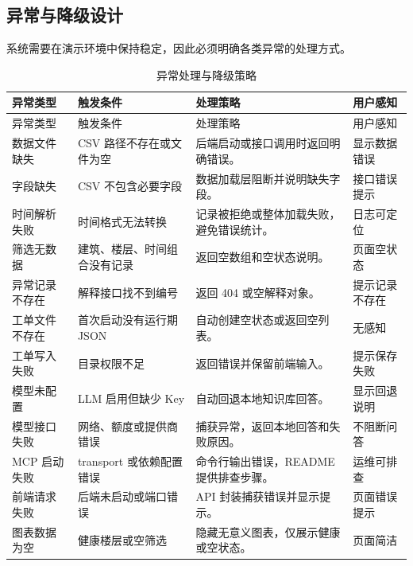 \documentclass[12pt,a4paper]{ctexart}
\begin{document}
\subsection{异常与降级设计}
系统需要在演示环境中保持稳定，因此必须明确各类异常的处理方式。
\begin{longtable}{L{3.0cm}L{4.4cm}L{5.0cm}L{2.9cm}}
\caption{异常处理与降级策略}\\
\toprule
异常类型 & 触发条件 & 处理策略 & 用户感知 \\
\midrule
\endfirsthead
\toprule
异常类型 & 触发条件 & 处理策略 & 用户感知 \\
\midrule
\endhead
数据文件缺失 & CSV 路径不存在或文件为空 & 后端启动或接口调用时返回明确错误。 & 显示数据错误 \\
字段缺失 & CSV 不包含必要字段 & 数据加载层阻断并说明缺失字段。 & 接口错误提示 \\
时间解析失败 & 时间格式无法转换 & 记录被拒绝或整体加载失败，避免错误统计。 & 日志可定位 \\
筛选无数据 & 建筑、楼层、时间组合没有记录 & 返回空数组和空状态说明。 & 页面空状态 \\
异常记录不存在 & 解释接口找不到编号 & 返回 404 或空解释对象。 & 提示记录不存在 \\
工单文件不存在 & 首次启动没有运行期 JSON & 自动创建空状态或返回空列表。 & 无感知 \\
工单写入失败 & 目录权限不足 & 返回错误并保留前端输入。 & 提示保存失败 \\
模型未配置 & LLM 启用但缺少 Key & 自动回退本地知识库回答。 & 显示回退说明 \\
模型接口失败 & 网络、额度或提供商错误 & 捕获异常，返回本地回答和失败原因。 & 不阻断问答 \\
MCP 启动失败 & transport 或依赖配置错误 & 命令行输出错误，README 提供排查步骤。 & 运维可排查 \\
前端请求失败 & 后端未启动或端口错误 & API 封装捕获错误并显示提示。 & 页面错误提示 \\
图表数据为空 & 健康楼层或空筛选 & 隐藏无意义图表，仅展示健康或空状态。 & 页面简洁 \\
\bottomrule
\end{longtable}
\end{document}
